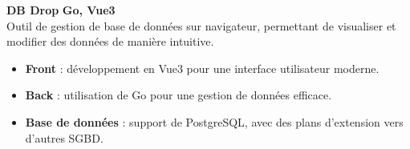 \documentclass[a4paper,10pt]{article}
\begin{document}
\begin{paracol}{2}
\begin{flushleft}
  \textbf{DB Drop} \hfill \textbf{Go, Vue3} \\
  Outil de gestion de base de données sur navigateur, permettant de visualiser et modifier des données de manière intuitive.
  \begin{itemize}[left=0pt,nosep,topsep=2pt]
    \item \textbf{Front} : développement en Vue3 pour une interface utilisateur moderne.
    \item \textbf{Back} : utilisation de Go pour une gestion de données efficace.
    \item \textbf{Base de données} : support de PostgreSQL, avec des plans d'extension vers d'autres SGBD.
  \end{itemize}

\end{flushleft}
  
\end{paracol}
\end{document}
